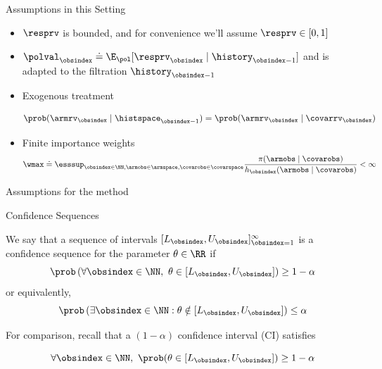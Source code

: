 \documentclass[aspectratio=169, professionalfonts]{beamer}
\begin{document}
\begin{frame}{Assumptions in this Setting}
	\begin{itemize}
		\item $\resprv$ is bounded, and for convenience we'll assume $\resprv \in [0,1]$
		      \vfill
		\item $\polval_{\obsindex} \doteq \E_{\pol} [\resprv_{\obsindex} \mid
				      \history_{\obsindex-1}]$ and is adapted to the filtration $\history_{\obsindex-1}$
		      \vfill

		\item 	Exogenous treatment

		      $$\prob(\armrv_{\obsindex} \mid \histspace_{\obsindex - 1}) =
			      \prob(\armrv_{\obsindex} \mid \covarrv_{\obsindex})$$

		\item Finite importance weights
		      \[\wmax \doteq \esssup_{\obsindex \in \NN, \armobs \in \armspace, \covarobs \in
				      \covarspace} \frac{\pi(\armobs \mid \covarobs)}{h_{\obsindex}(\armobs \mid
				      \covarobs)} < \infty\]
	\end{itemize}






\end{frame}

\begin{frame}{Assumptions for the method}
\end{frame}

\begin{frame}{Confidence Sequences}
	\begin{definition}
		We say that a sequence of intervals $[L_\obsindex, U_\obsindex]_{\obsindex=1}^\infty$ is a confidence sequence for the parameter $\theta \in \RR$ if
		\begin{equation*}\label{eq:cs}
			\prob \left ( \forall \obsindex \in \NN,\ \theta \in [L_\obsindex, U_\obsindex] \right ) \geq 1-\alpha \end{equation*}
		or equivalently,
		\begin{equation*}
			\prob \left ( \exists \obsindex \in \NN : \theta \notin [L_\obsindex, U_\obsindex] \right ) \leq \alpha
		\end{equation*}
	\end{definition}

	\vfill \pause
	For comparison, recall that a $(1- \alpha)$ confidence interval (CI) satisfies

	$$\forall \obsindex \in \NN,\ \prob(\theta \in [L_\obsindex, U_\obsindex]) \geq 1-\alpha$$
\end{frame}
\end{document}
